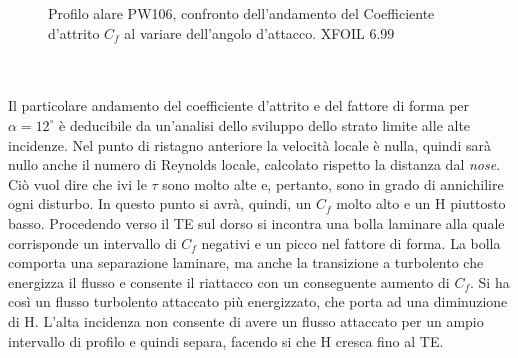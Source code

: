 \begin{figure} [H]
\centering
{}
\caption{\footnotesize Profilo alare PW106, confronto dell'andamento del Coefficiente d'attrito $C_f$ al variare dell'angolo d'attacco. XFOIL 6.99}
\end{figure}
\noindent \\ \\ 

Il particolare andamento del coefficiente d'attrito e del fattore di forma per $ \alpha=12^\circ$ è deducibile da un’analisi dello sviluppo dello strato limite alle alte incidenze. Nel punto di ristagno anteriore la velocità locale è nulla, quindi sarà nullo anche il numero di Reynolds locale, calcolato rispetto la distanza dal {\itshape nose}. Ciò vuol dire che ivi le $\tau$ sono molto alte e, pertanto, sono in grado di annichilire ogni disturbo. In questo punto si avrà, quindi, un $C_f$ molto alto e un H piuttosto basso. Procedendo verso il TE sul dorso si incontra una bolla laminare alla quale corrisponde un intervallo di $C_f$ negativi e un picco nel fattore di forma. La bolla comporta una separazione laminare, ma anche la transizione a turbolento che energizza il flusso e consente il riattacco con un conseguente aumento di $C_f$. Si ha così un flusso turbolento attaccato più energizzato, che porta ad una diminuzione di H. L'alta incidenza non consente di avere un flusso attaccato per un ampio intervallo di profilo e quindi separa, facendo si che H cresca fino al TE.

